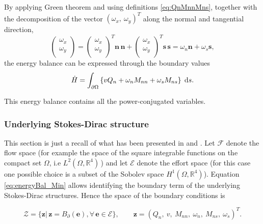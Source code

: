 \documentclass[preprint,12pt]{elsarticle}
\begin{document}
By applying Green theorem and using definitions \eqref{eq:QnMnnMns}, together with the decomposition of the vector $(\omega_x,\ \omega_y)^T$ along the normal and tangential direction,
\begin{equation*} 
\begin{pmatrix}
\omega_x \\
\omega_y \\
\end{pmatrix}
= \begin{pmatrix}
\omega_x \\
\omega_y \\
\end{pmatrix}^T \bm{n} \,\bm{n} + \begin{pmatrix}
\omega_x \\
\omega_y \\
\end{pmatrix}^T \bm{s} \, \bm{s} = \omega_n \bm{n} +   \omega_s \bm{s},\end{equation*}
the energy balance can be expressed through the boundary values
\begin{equation}
\label{eq:energyBal_Min}
\dot{H} = \int_{\partial \Omega} \left\{v Q_n + \omega_n M_{nn} + \omega_s M_{ns}  \right\} \d{s}.
\end{equation}

This energy balance contains all the power-conjugated variables.


\subsubsection{Underlying Stokes-Dirac structure} 

This section is just a recall of what has been  presented in \cite{MacchelliMindlin} and \cite{MacchelliModelling}. Let $\mathcal{F}$ denote the flow space (for example the space of the square integrable functions on the compact set $\Omega$, i.e $L^2(\Omega, \mathbb{R}^4) \,$) and let $\mathcal{E}$ denote the effort space (for this case one possible choice is a subset of the Sobolev space $H^1(\Omega, \mathbb{R}^4)$). Equation \eqref{eq:energyBal_Min} allows identifying the boundary term of the underlying Stokes-Dirac structures. Hence the space of the boundary conditions is

\begin{equation*}
\mathcal{Z} = \{\bm{z} | \, \bm{z} = B_{\partial}(\bm{e}), \forall \, \bm{e} \in \mathcal{E} \},  \qquad \bm{z} = \left(Q_n,\ v,\ M_{nn},\ \omega_n,\ M_{ns},\ \omega_s \right)^T.
\end{equation*}
\end{document}
